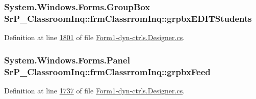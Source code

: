 \hypertarget{class_sr_p___classroom_inq_1_1frm_classrrom_inq_a934cec75a0d91eca5ca9786b078462a3}{
\subsubsection[{grpbx\-E\-D\-I\-T\-Students}]{\setlength{\rightskip}{0pt plus 5cm}\-System.\-Windows.\-Forms.\-Group\-Box {\bf \-Sr\-P\-\_\-\-Classroom\-Inq\-::frm\-Classrrom\-Inq\-::grpbx\-E\-D\-I\-T\-Students}}}
\label{class_sr_p___classroom_inq_1_1frm_classrrom_inq_a934cec75a0d91eca5ca9786b078462a3}


\-Definition at line \hyperlink{_form1-dyn-ctrls_8_designer_8cs_source_l01801}{1801} of file \hyperlink{_form1-dyn-ctrls_8_designer_8cs_source}{\-Form1-\/dyn-\/ctrls.\-Designer.\-cs}.

\hypertarget{class_sr_p___classroom_inq_1_1frm_classrrom_inq_aef19294d5a98aeb9030537fe32d25fde}{
\subsubsection[{grpbx\-Feed}]{\setlength{\rightskip}{0pt plus 5cm}\-System.\-Windows.\-Forms.\-Panel {\bf \-Sr\-P\-\_\-\-Classroom\-Inq\-::frm\-Classrrom\-Inq\-::grpbx\-Feed}}}
\label{class_sr_p___classroom_inq_1_1frm_classrrom_inq_aef19294d5a98aeb9030537fe32d25fde}


\-Definition at line \hyperlink{_form1-dyn-ctrls_8_designer_8cs_source_l01737}{1737} of file \hyperlink{_form1-dyn-ctrls_8_designer_8cs_source}{\-Form1-\/dyn-\/ctrls.\-Designer.\-cs}.


